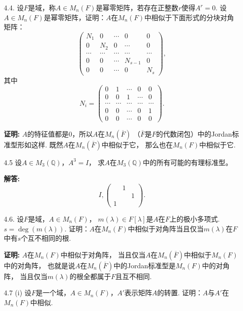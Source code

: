 \begin{enumerate}
    \item[4.4.]设$F$是域，称$A\in M_n(F)$是幂零矩阵，若存在正整数$r$使得$A^r=0$.
    设$A\in M_n(F)$是幂零矩阵，证明：$A$在$M_n(F)$中相似于下面形式的分块对角矩阵：
    $$\begin{pmatrix}N_1&0&\cdots&0&0\\
        0&N_2&0&\cdots&0\\
        \cdots&\cdots&\cdots&\cdots&\cdots\\
        0&0&\cdots&N_{s-1}&0\\
        0&0&\cdots&0&N_s
    \end{pmatrix},$$
    其中
    $$N_i=\begin{pmatrix}0&1&\cdots&0&0\\
        0&0&1&\cdots&0\\
        \cdots&\cdots&\cdots&\cdots&\cdots\\
        0&0&\cdots&0&1\\
        0&0&\cdots&0&0
    \end{pmatrix}.$$
    \item[\textbf{证明:}]
    $A$的特征值都是$0$，所以$A$在$M_n(\overline{F})$
    （$\overline{F}$是$F$的代数闭包）中的Jordan标准型形如这样.
    既然$A$在$M_n(\overline{F})$中相似于它，
    那么也在$M_n(F)$中相似于它.

    \item[4.5]设$A\in M_3(\mathbb{Q})$，$A^3=I$，
    求$A$在$M_3(\mathbb{Q})$中的所有可能的有理标准型。

    \item[\textbf{解答:}]
    $$I,\begin{pmatrix} &1& \\ & &1\\1& & \end{pmatrix}.$$

    \item[4.6.]设$F$是域，$A\in M_n(F)$，
    $m(\lambda)\in F[\lambda]$是$A$在$F$上的极小多项式.
    $s=\deg(m(\lambda))$.
    证明：$A$在$M_n(F)$中相似于对角阵当且仅当$m(\lambda)$在$F$中有$s$个互不相同的根.
    \item[\textbf{证明:}]
    $A$在$M_n(F)$中相似于对角阵，
    当且仅当$A$在$M_n(\overline{F})$中相似于$M_n(F)$中的对角阵，
    也就是说$A$在$M_n(\overline{F})$中的Jordan标准型是$M_n(F)$中的对角阵，
    当且仅当$m(\lambda)$的根全都属于$F$且互不相同.

    \item[4.7](i) 设$F$是一个域，$A\in M_n(F)$，$A'$表示矩阵$A$的转置.
    证明：$A$与$A'$在$M_n(F)$中相似.


\end{enumerate}
